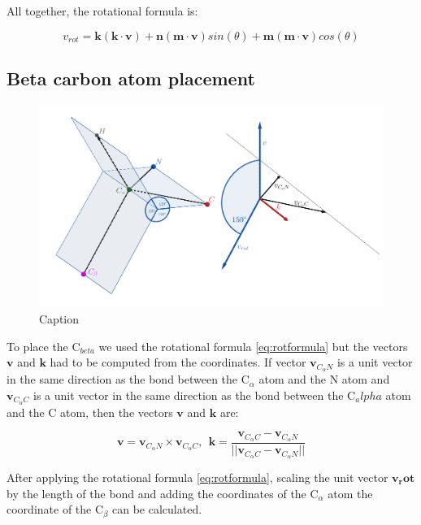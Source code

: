 All together, the rotational formula is:

\begin{equation}
    v_{rot} = \bm{k}(\bm{k} \cdot \bm{v}) + \bm{n} (\bm{m} \cdot \bm{v}) sin(\theta) + \bm{m} (\bm{m} \cdot \bm{v}) cos(\theta)
    \label{eq:rotformula}
\end{equation}

\subsection{Beta carbon atom placement}

\begin{figure}
    \centering
    \includegraphics[width=\linewidth]{imgs_tomas/cbeta.png}
    \caption{Caption}
    \label{fig:cbeta}
\end{figure}

To place the C$_{beta}$ we used the rotational formula \ref{eq:rotformula} but the vectors $\bm{v}$ and $\bm{k}$ had to be computed from the coordinates. If vector $\bm{v}_{C_\alpha N}$ is a unit vector in the same direction as the bond between the C$_\alpha$ atom and the N atom and $\bm{v}_{C_\alpha C}$ is a unit vector in the same direction as the bond between the C$_alpha$ atom and the C atom, then the vectors $\bm{v}$ and $\bm{k}$ are:

$$\bm{v} = \bm{v}_{C_\alpha N} \times  \bm{v}_{C_\alpha C}, ~~ \bm{k} = \frac{\bm{v}_{C_\alpha C} -  \bm{v}_{C_\alpha N}}{||\bm{v}_{C_\alpha C} -  \bm{v}_{C_\alpha N}||}$$

After applying the rotational formula \ref{eq:rotformula}, scaling the unit vector $\bm{v_rot}$ by the length of the bond and adding the coordinates of the C$_\alpha$ atom the coordinate of the C$_\beta$ can be calculated.

